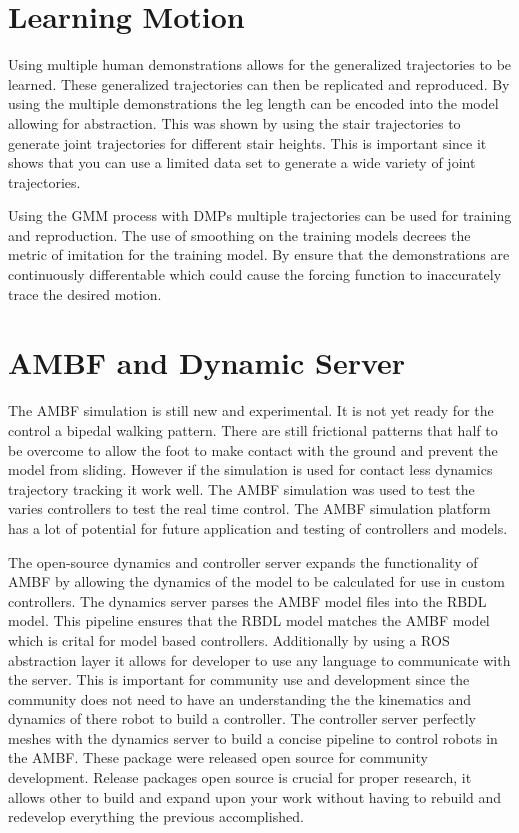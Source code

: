 \section{Learning Motion}


Using multiple human demonstrations allows for the generalized trajectories to be learned. These generalized trajectories can then be replicated and reproduced. By using the multiple demonstrations the leg length can be encoded into the model allowing for abstraction. This was shown by using the stair trajectories to generate joint trajectories for different stair heights. This is important since it shows that you can use a limited data set to generate a wide variety of joint trajectories. 

Using the GMM process with DMPs multiple trajectories can be used for training and reproduction. The use of smoothing on the training models decrees the metric of imitation for the training model. By ensure that the demonstrations  are continuously differentable which could cause the forcing function to inaccurately trace the desired motion. 


\section{AMBF and Dynamic Server}


The AMBF simulation is still new and experimental. It is not yet ready for the control a bipedal walking pattern. There are still frictional patterns that half to be overcome to allow the foot to make contact with the ground and prevent the model from sliding. However if the simulation is used for contact less dynamics trajectory tracking it work well. The AMBF simulation was used to test the varies controllers to test the real time control. The AMBF simulation platform has a lot of potential for future application and testing of controllers and models. 

The open-source dynamics and controller server expands the functionality of AMBF by allowing the dynamics of the model to be calculated for use in custom controllers. The dynamics server parses the AMBF model files into the RBDL model. This pipeline ensures that the RBDL model matches the AMBF model which is crital for model based controllers. Additionally by using a ROS abstraction layer it allows for developer to use any language to communicate with the server. This is important for community use and development since the community does not need to have an understanding the the kinematics and dynamics of there robot to build a controller. The controller server perfectly meshes with the dynamics server to build a concise pipeline to control robots in the AMBF. These package were released open source for community development. Release packages open source is crucial for proper research, it allows other to build and expand upon your work without having to rebuild and redevelop everything the previous accomplished.   


